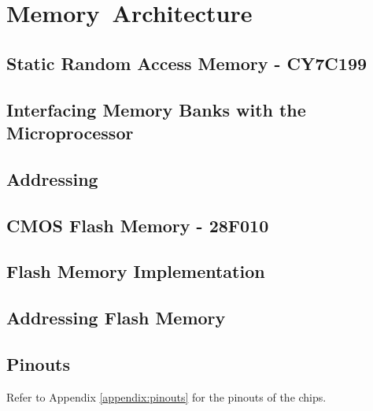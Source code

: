 \newpage
\section{Memory Architecture}

    \subsection{Static Random Access Memory - CY7C199}

    \subsection{Interfacing Memory Banks with the Microprocessor}

    \subsection{Addressing}

    \subsection{CMOS Flash Memory - 28F010}

    \subsection{Flash Memory Implementation}

    \subsection{Addressing Flash Memory}

    \subsection{Pinouts}
    Refer to Appendix \ref{appendix:pinouts} for the pinouts of the chips.
